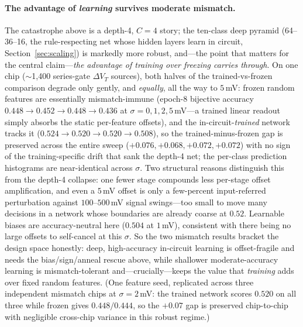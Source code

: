 \documentclass[11pt]{article}
\begin{document}
\paragraph{The advantage of \emph{learning} survives moderate mismatch.} The catastrophe above is a depth-4, $C{=}4$ story; the ten-class deep pyramid (64--36--16, the rule-respecting net whose hidden layers learn in circuit, Section~\ref{sec:scaling}) is markedly more robust, and---the point that matters for the central claim---\emph{the advantage of training over freezing carries through}. On one chip ($\sim$1{,}400 series-gate $\Delta V_T$ sources), both halves of the trained-vs-frozen comparison degrade only gently, and \emph{equally}, all the way to $5$\,mV: frozen random features are essentially mismatch-immune (epoch-8 bijective accuracy $0.448\!\to\!0.452\!\to\!0.448\!\to\!0.436$ at $\sigma{=}0,1,2,5$\,mV---a trained linear readout simply absorbs the static per-feature offsets), and the in-circuit-\emph{trained} network tracks it ($0.524\!\to\!0.520\!\to\!0.520\!\to\!0.508$), so the trained-minus-frozen gap is preserved across the entire sweep ($+0.076,+0.068,+0.072,+0.072$) with no sign of the training-specific drift that sank the depth-4 net; the per-class prediction histograms are near-identical across $\sigma$. Two structural reasons distinguish this from the depth-4 collapse: one fewer stage compounds less per-stage offset amplification, and even a $5$\,mV offset is only a few-percent input-referred perturbation against $100$--$500$\,mV signal swings---too small to move many decisions in a network whose boundaries are already coarse at $0.52$. Learnable biases are accuracy-neutral here ($0.504$ at $1$\,mV), consistent with there being no large offsets to self-cancel at this $\sigma$. So the two mismatch results bracket the design space honestly: deep, high-accuracy in-circuit learning is offset-fragile and needs the bias/sign/anneal rescue above, while shallower moderate-accuracy learning is mismatch-tolerant and---crucially---keeps the value that \emph{training} adds over fixed random features. (One feature seed, replicated across three independent mismatch chips at $\sigma{=}2$\,mV: the trained network scores $0.520$ on all three while frozen gives $0.448/0.444$, so the $+0.07$ gap is preserved chip-to-chip with negligible cross-chip variance in this robust regime.)
\end{document}
